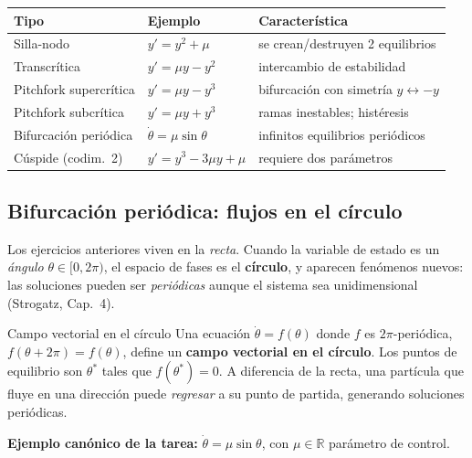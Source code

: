\documentclass[11pt,letterpaper]{article}
\begin{document}
\begin{center}
\begin{tabular}{lll}
\toprule
Tipo & Ejemplo & Característica\\
\midrule
Silla-nodo & $y'=y^2+\mu$ & se crean/destruyen 2 equilibrios\\
Transcrítica & $y'=\mu y-y^2$ & intercambio de estabilidad\\
Pitchfork supercrítica & $y'=\mu y-y^3$ & bifurcación con simetría $y\leftrightarrow -y$\\
Pitchfork subcrítica & $y'=\mu y+y^3$ & ramas inestables; histéresis\\
Bifurcación periódica & $\dot\theta=\mu\sin\theta$ & infinitos equilibrios periódicos\\
Cúspide (codim.~2) & $y'=y^3-3\mu y+\mu$ & requiere dos parámetros\\
\bottomrule
\end{tabular}
\end{center}

\subsection{Bifurcación periódica: flujos en el círculo}

Los ejercicios anteriores viven en la \emph{recta}. Cuando la variable de estado
es un \emph{ángulo} $\theta\in[0,2\pi)$, el espacio de fases es el \textbf{círculo},
y aparecen fenómenos nuevos: las soluciones pueden ser \emph{periódicas} aunque el
sistema sea unidimensional (Strogatz, Cap.~4).

\begin{definicion}{Campo vectorial en el círculo}{}
Una ecuación $\dot\theta=f(\theta)$ donde $f$ es $2\pi$-periódica,
$f(\theta+2\pi)=f(\theta)$, define un \textbf{campo vectorial en el círculo}.
Los puntos de equilibrio son $\theta^*$ tales que $f(\theta^*)=0$.
A diferencia de la recta, una partícula que fluye en una dirección puede
\emph{regresar} a su punto de partida, generando soluciones periódicas.
\end{definicion}

\textbf{Ejemplo canónico de la tarea:} $\dot\theta=\mu\sin\theta$, con
$\mu\in\mathbb{R}$ parámetro de control.
\end{document}
